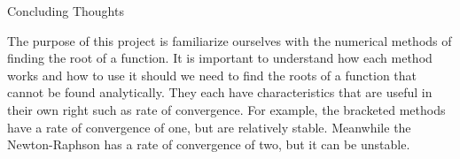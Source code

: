 \documentclass[12pt]{article}
\begin{document}
\pagebreak

\begin{center}
Concluding Thoughts
\end{center}
The purpose of this project is familiarize ourselves with the numerical methods of finding the root of a function. It is important to understand how each method works and how to use it should we need to find the roots of a function that cannot be found analytically. They each have characteristics that are useful in their own right such as rate of convergence. For example, the bracketed methods have a rate of convergence of one, but are relatively stable. Meanwhile the Newton-Raphson has a rate of convergence of two, but it can be unstable.
\end{document}
